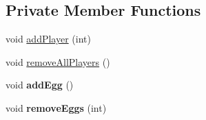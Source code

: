 \subsection*{Private Member Functions}
\begin{DoxyCompactItemize}
\item 
void \hyperlink{classGraphicLevel_a38f05c45d2e3818ba737ceb4cdac11a2}{addPlayer} (int)
\item 
void \hyperlink{classGraphicLevel_a2727bfe10c94494b7dddd4413d99cbff}{removeAllPlayers} ()
\item 
\hypertarget{classGraphicLevel_ac08e2fd16ccb3abaabe81cf4a6d441a3}{
void {\bfseries addEgg} ()}
\label{classGraphicLevel_ac08e2fd16ccb3abaabe81cf4a6d441a3}

\item 
\hypertarget{classGraphicLevel_a3d996481f164fb06bce8a994b1eafb4d}{
void {\bfseries removeEggs} (int)}
\label{classGraphicLevel_a3d996481f164fb06bce8a994b1eafb4d}

\end{DoxyCompactItemize}
